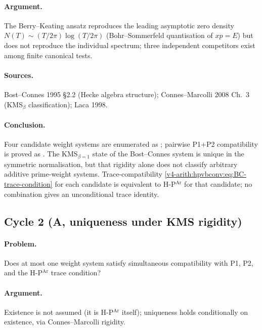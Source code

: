 \paragraph{Argument.} The Berry--Keating ansatz reproduces the
leading asymptotic zero density \(N(T)\sim(T/2\pi)\log(T/2\pi)\)
(Bohr--Sommerfeld quantisation of \(xp=E\)) but does not reproduce the
individual spectrum; three independent competitors exist among finite
canonical tests.

\paragraph{Sources.} Bost--Connes 1995 \S2.2 (Hecke algebra
structure); Connes--Marcolli 2008 Ch.~3 (KMS\({}_{\beta}\)
classification); Laca 1998.

\paragraph{Conclusion.} Four candidate weight systems are enumerated as
; pairwise
P1+P2 compatibility is proved as
. The KMS\({}_{\beta=1}\) state of the
Bost--Connes system is unique in the symmetric normalisation, but that
rigidity alone does not classify arbitrary additive prime-weight
systems. Trace-compatibility
\eqref{v4-arith:hpvbconv:eq:BC-trace-condition} for each candidate
is equivalent to H-P\(^{\mathrm{Ar}}\) for that candidate; no
combination gives an unconditional trace identity.

\subsection{Cycle 2 (A, uniqueness under KMS rigidity)}
\label{v4-arith:hpar-det:cycle-2}

\paragraph{Problem.} Does at most one weight system satisfy
simultaneous compatibility with P1, P2, and the
H-P\(^{\mathrm{Ar}}\) trace condition?

\paragraph{Argument.} Existence is not assumed (it is H-P\(^{\mathrm{Ar}}\)
itself); uniqueness holds conditionally on existence, via
Connes--Marcolli rigidity.

